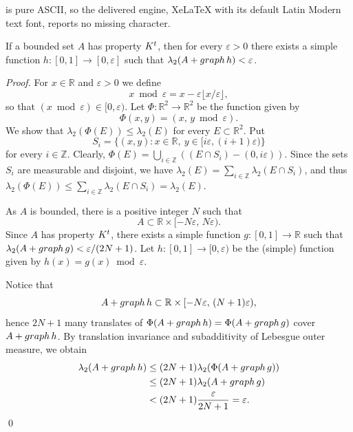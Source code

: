 \documentclass[10pt,a4paper]{amsart}
\def\ep{\varepsilon}
\def\graph{{\rm graph}\, }
\def\la{\lambda}
\def\nl{[0,1]}
\def\rr{{\mathbb R}}
\def\sik{{\rr}^2}
\def\su{\subset}
\def\zz{{\mathbb Z}}
\begin{document}
is pure ASCII, so the delivered engine, XeLaTeX with its default Latin Modern text font, reports no missing character.
\begin{lemma} \label{l1}
If a bounded set $A$ has property ${\rm K}^t$, then for every $\ep >0$ there
exists a simple function $h\colon \nl \to [0,\ep ]$ such that
$\la _2 (A+\graph h) <\ep$.
\end{lemma}

\begin{proof}
For $x\in \rr$ and $\ep>0$ we define
$$x \bmod \ep = x-\ep\lfloor x/\ep \rfloor,$$
so that $(x \bmod \ep) \in [0,\ep)$. Let $\Phi:\rr^2 \to \rr^2$ be the function
given by
$$\Phi(x,y)=(x, \,y \bmod \ep).$$
We show that $\la _2 (\Phi (E))\le \la _2 (E)$ for every $E\su \sik$. Put
$$S_i =\{ (x,y)\colon x\in \rr , \ y\in [i\ep ,(i+1)\ep )\}$$
for every $i\in \zz$. Clearly, $\Phi (E)=\bigcup_{i\in \zz} ((E\cap S_i )-
(0,i\ep ))$. Since the sets $S_i$ are measurable and disjoint, we have
$\la _2 (E)= \sum_{i\in \zz} \la _2 (E\cap S_i )$, and thus $\la _2 (\Phi (E))
\le \sum_{i\in \zz} \la _2 (E\cap S_i ) = \la _2 (E)$.

As $A$ is bounded, there is a positive integer $N$ such that
$$A\subset \rr\times [-N\ep, \,N\ep).$$
Since $A$ has property ${\rm K}^t$, there exists a simple function
$g\colon \nl \to \rr$ such that $\la _2 (A+\graph g) <\ep/(2N+1)$.
Let $h\colon [0,1]\to [0,\ep)$ be the (simple) function given by $h(x)=g(x) \bmod \ep$.

Notice that 
$$A+\graph h \subset \rr\times [-N\ep, \,(N+1)\ep),$$
hence $2N+1$ many translates of $\Phi(A+\graph h)=\Phi(A+\graph g)$ cover $A+\graph h$.
By translation invariance and subadditivity of Lebesgue outer measure, we obtain
\begin{align*}
\la_2(A+\graph h) &\le (2N+1) \la_2(\Phi(A+\graph g))\\
& \le (2N+1) \la_2(A+\graph g) \\
& < (2N+1) \frac{\ep}{2N+1} =\ep. 
\end{align*}
\qed
\end{proof}
\end{document}
